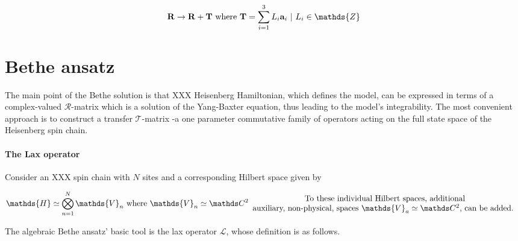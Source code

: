 \documentclass{homework}
\begin{document}
$$
\Rb \rightarrow \Rb + {\bf T} \textnormal{ where } {\bf T} = \sum_{i=1}^{3} L_i {\bf a}_i \blanky | \blanky L_i \in \mathds{Z}
$$

\clearpage

\section{Bethe ansatz}

The main point of the Bethe solution is that XXX Heisenberg Hamiltonian, which defines the model, can be expressed in terms of a complex-valued $\bm{\mathcal R}$-matrix which is a solution of the Yang-Baxter equation, thus leading to the model's integrability. The most convenient approach is to construct a transfer $\bm{\mathcal{T}}$-matrix -a one parameter commutative family of operators acting on the full state space of the Heisenberg spin chain. \\

\paragraph{\textbf{The Lax operator}} Consider an XXX spin chain with $N$ sites and a corresponding Hilbert space given by 

\begin{align}
    \mathds{H} \simeq \bigotimes_{n=1}^{N} {\mathds{V}_n} \textnormal{ where } {\mathds{V}_n} \simeq \ctwo \begin{array}{c}
         \textnormal{To these individual Hilbert spaces, additional}  \\
         \textnormal{auxiliary, non-physical, spaces $\mathds{V}_a \simeq \ctwo$, can be added. } \\
    \end{array}
\end{align}

The algebraic Bethe ansatz' basic tool is the lax operator $\bm{\mathcal{L}}$, whose definition is as follows. 
\end{document}
